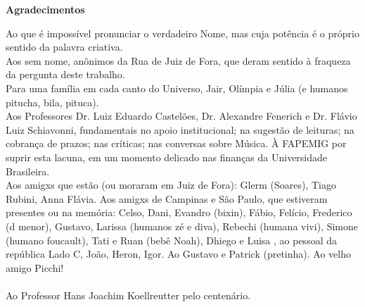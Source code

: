 \newpage
\begin{flushright}
\huge{\textbf{Agradecimentos}}

\small{Ao que é impossível pronunciar o verdadeiro Nome, mas cuja potência é o próprio sentido da palavra criativa.
\ \\
Aos sem nome, anônimos da Rua de Juiz de Fora, que deram sentido à fraqueza da pergunta deste trabalho.
\ \\
Para uma família em cada canto do Universo, Jair, Olímpia e Júlia (e humanos pitucha, bila, pituca). 
\ \\
Aos Professores Dr. Luiz Eduardo Castelões, Dr. Alexandre Fenerich e Dr. Flávio Luiz Schiavonni, fundamentais no apoio institucional; na sugestão de leituras; na cobrança de prazos; nas críticas; nas conversas sobre Música. À FAPEMIG por suprir esta lacuna, em um momento delicado nas finanças da Universidade Brasileira.
\ \\
Aos amigxs que estão (ou moraram em Juiz de Fora): Glerm (Soares), Tiago Rubini, Anna Flávia. Aos amigxs de Campinas e São Paulo, que estiveram presentes ou na memória: Celso, Dani, Evandro (bixin), Fábio, Felício, Frederico (d menor), Gustavo, Larissa (humanos zé e diva), Rebechi (humana vivi), Simone (humano foucault), Tati e Ruan (bebê Noah), Dhiego e Luisa , ao pessoal da república Lado C, João, Heron, Igor.  Ao Gustavo e Patrick (pretinha). Ao velho amigo Picchi!
\ \\
\ \\
Ao Professor Hans Joachim Koellreutter pelo centenário.}
\end{flushright}

\vfil \ 

\newpage